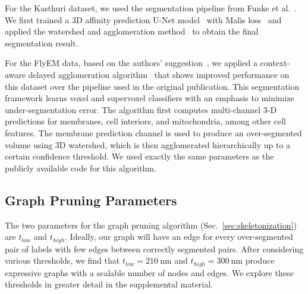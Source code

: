 For the Kasthuri dataset, we used the segmentation pipeline from Funke et al.~\cite{funke2017deep}. 
We first trained a 3D affinity prediction U-Net model~\cite{ronneberger2015u} with Malis loss~\cite{Turaga:2009} and applied the watershed and agglomeration method~\cite{funke2017deep} to obtain the final segmentation result.


For the FlyEM data, based on the authors' suggestion~\cite{takemura2017connectome}, we applied a context-aware delayed agglomeration algorithm~\cite{10.1371/journal.pone.0125825} that shows improved performance on this dataset over the pipeline used in the original publication. 
This segmentation framework learns voxel and supervoxel classifiers with an emphasis to minimize under-segmentation error. 
The algorithm first computes multi-channel 3-D predictions for membranes, cell interiors, and mitochondria, among other cell features. 
The membrane prediction channel is used to produce an over-segmented volume using 3D watershed, which is then agglomerated hierarchically up to a certain confidence threshold. 
We used exactly the same parameters as the publicly available code for this algorithm.

\subsection{Graph Pruning Parameters}

The two parameters for the graph pruning algorithm (Sec.~\ref{sec:skeletonization}) are $t_{low}$ and $t_{high}$. 
Ideally, our graph will have an edge for every over-segmented pair of labels with few edges between correctly segmented pairs. 
After considering various thresholds, we find that $t_{low} = \SI{210}{\nano\meter}$ and $t_{high} = \SI{300}{\nano\meter}$ produce expressive graphs with a scalable number of nodes and edges.
We explore these thresholds in greater detail in the supplemental material.

